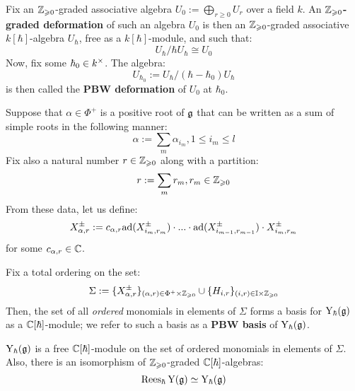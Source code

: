         \begin{definition} \label{def: graded_and_PBW_deformations}
            Fix an $\mathbb{Z}_{\geqslant 0}$-graded associative algebra $U_0 := \bigoplus_{r \geq 0} U_r$ over a field $k$. An \textbf{$\mathbb{Z}_{\geqslant 0}$-graded deformation} of such an algebra $U_0$ is then an $\mathbb{Z}_{\geqslant 0}$-graded associative $k[\hbar]$-algebra $U_{\hbar}$, free as a $k[\hbar]$-module, and such that:
                $$U_{\hbar}/\hbar U_{\hbar} \cong U_0$$
            Now, fix some $\hbar_0 \in k^{\x}$. The algebra:
                $$U_{\hbar_0} := U_{\hbar}/(\hbar - \hbar_0)U_{\hbar}$$
            is then called the \textbf{PBW deformation} of $U_0$ at $\hbar_0$.  
        \end{definition}
        \begin{convention}
            Suppose that $\alpha \in \Phi^+$ is a positive root of $\mathfrak{g}$ that can be written as a sum of simple roots in the following manner:
                $$\alpha := \sum_m \alpha_{i_m}, 1 \leq i_m \leq l$$
            Fix also a natural number $r \in \mathbb{Z}_{\geqslant 0}$ along with a partition:
                $$r := \sum_m r_m, r_m \in \mathbb{Z}_{\geqslant 0}$$
            From these data, let us define:
                $$X_{\alpha, r}^{\pm} := c_{\alpha, r} \mathrm{ad}( X_{i_m, r_m}^{\pm} ) \cdot ... \cdot \mathrm{ad}( X_{i_{m - 1}, r_{m - 1}}^{\pm} ) \cdot X_{i_m, r_m}^{\pm}$$
            for some $c_{\alpha, r} \in \mathbb{C}$.
        \end{convention}
        \begin{theorem} \label{theorem: PBW_bases_for_formal_yangians}
            Fix a total ordering on the set:
                $$\Sigma := \{X_{\alpha, r}^{\pm}\}_{(\alpha, r) \in \Phi^+ \x \Z_{\geq 0}} \cup \{H_{i, r}\}_{(i, r) \in \simpleroots \x \Z_{\geq 0}}$$
            Then, the set of all \textit{ordered} monomials in elements of $\Sigma$ forms a basis for $\mathrm{Y}_{\hbar}(\mathfrak{g})$ as a $\mathbb{C}[\hbar]$-module; we refer to such a basis as a \textbf{PBW basis} of $\mathrm{Y}_{\hbar}(\mathfrak{g})$. 
        \end{theorem}
        \begin{corollary} \label{coro: formal_yangians_as_graded_deformations}
            $\mathrm{Y}_{\hbar}(\mathfrak{g})$ is a free $\mathbb{C}[\hbar]$-module on the set of ordered monomials in elements of $\Sigma$. Also, there is an isomorphism of $\mathbb{Z}_{\geqslant 0}$-graded $\mathbb{C}[\hbar]$-algebras:
                $$\operatorname{Rees}_{\hbar} \mathrm{Y}(\mathfrak{g}) \simeq \mathrm{Y}_{\hbar}(\mathfrak{g})$$
        \end{corollary}

